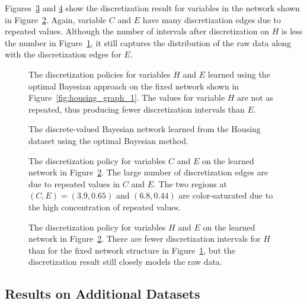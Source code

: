 Figures~\ref{fig:housing_exp2_distr_3_5} and \ref{fig:housing_exp2_distr_8_5} show the discretization result for variables in the network shown in Figure~\ref{fig:housing_graph_2}.
Again, variable $C$ and $E$ have many discretization edges due to repeated values.
Although the number of intervals after discretization on $H$ is less the number in Figure~\ref{fig:housing_exp1_distr_8_5}, it still captures the distribution of the raw data along with the discretization edges for $E$.

\begin{figure}[H]
  \centering
  
  \caption{
    The discretization policies for variables $H$ and $E$ learned using the optimal Bayesian approach on the fixed network shown in Figure~\ref{fig:housing_graph_1}.
    The values for variable $H$ are not as repeated, thus producing fewer discretization intervals than $E$.
  }
  \label{fig:housing_exp1_distr_8_5}
\end{figure}

\begin{figure}[H]
  \centering
  \scalebox{0.8}{}
  \caption{
    The discrete-valued Bayesian network learned from the Housing dataset using the optimal Bayesian method.
  }
  \label{fig:housing_graph_2}
\end{figure}

\begin{figure}[H]
  \centering
  
  \caption{
    The discretization policy for variables $C$ and $E$ on the learned network in Figure~\ref{fig:housing_graph_2}.
    The large number of discretization edges are due to repeated values in $C$ and $E$.
    The two regions at $(C,E) = (3.9,0.65)$ and $(6.8,0.44)$ are color-saturated due to the high concentration of repeated values.
  }
  \label{fig:housing_exp2_distr_3_5}
\end{figure}

\begin{figure}[H]
  \centering
  
  \caption{
    The discretization policy for variables $H$ and $E$ on the learned network in Figure~\ref{fig:housing_graph_2}.
    There are fewer discretization intervals for $H$ than for the fixed network structure in Figure~\ref{fig:housing_exp1_distr_8_5}, but the discretization result still closely models the raw data.
  }
  \label{fig:housing_exp2_distr_8_5}
\end{figure}

\subsection{Results on Additional Datasets}

